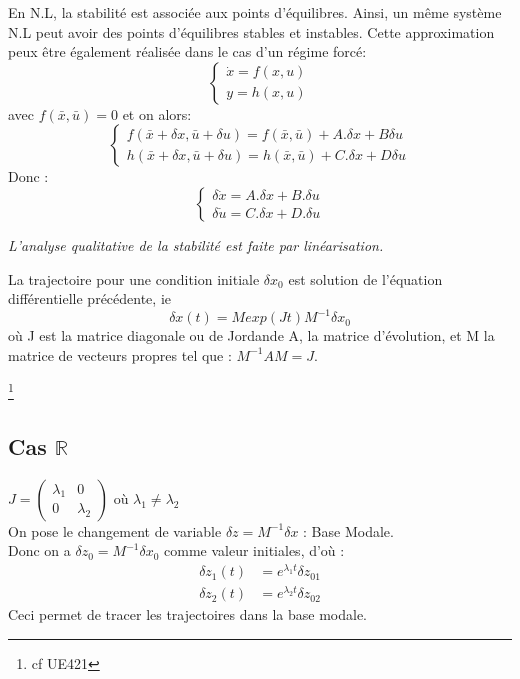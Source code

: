 \documentclass[main.tex]{subfiles}
\begin{document}
\begin{rem}
En N.L, la stabilité est associée aux points d'équilibres. Ainsi, un même système N.L peut avoir des points d'équilibres stables et instables.
  Cette approximation peux être également réalisée dans le cas d'un régime forcé:
  \[
    \begin{cases}
      \dot{x} = f(x,u)\\
      y = h(x,u)
    \end{cases}
  \]
  avec $f(\bar{x},\bar{u}) = 0$ et on alors:
  \[
    \begin{cases}
      f(\bar{x}+\delta x,\bar{u}+\delta u) = f(\bar{x},\bar{u}) + A. \delta x + B \delta u\\
      h(\bar{x}+\delta x,\bar{u}+\delta u) = h(\bar{x},\bar{u}) + C. \delta x + D \delta u
    \end{cases}
  \]
  Donc :
  \[
    \begin{cases}
      \delta \dot{x} = A. \delta x + B. \delta u \\
      \delta \dot{u} = C. \delta x + D. \delta u
  \end{cases}
  \]
\end{rem}
\emph{L'analyse qualitative de la stabilité est faite par linéarisation.} \\
\begin{prop}
La trajectoire pour une condition initiale $\delta x_0$ est solution de l'équation différentielle précédente, ie \[\delta x(t) = M exp(Jt)M^{-1}\delta x_0\] où J est la matrice diagonale ou de Jordan\footnotemark de A, la matrice d'évolution, et M la matrice de vecteurs propres tel que : $M^{-1}AM = J$.\\
\end{prop}
\footnote{cf UE421}
\subsection{Cas $\mathbb{R}$}
$J = \begin{pmatrix}
\lambda_1 &0 \\0&\lambda_2
\end{pmatrix}$ où $\lambda_1 \neq \lambda_2$\\
On pose le changement de variable $\delta z = M^{-1}\delta x$ : Base Modale.\\ Donc on a $\delta z_0 = M^{-1}\delta x_0$ comme valeur initiales, d'où :
\begin{align*}
\delta z_1(t) &= e^{\lambda_1t}\delta z_{01}\\
\delta z_2(t) &= e^{\lambda_2t}\delta z_{02}
\end{align*}
Ceci permet de tracer les trajectoires dans la base modale.\\
\end{document}
